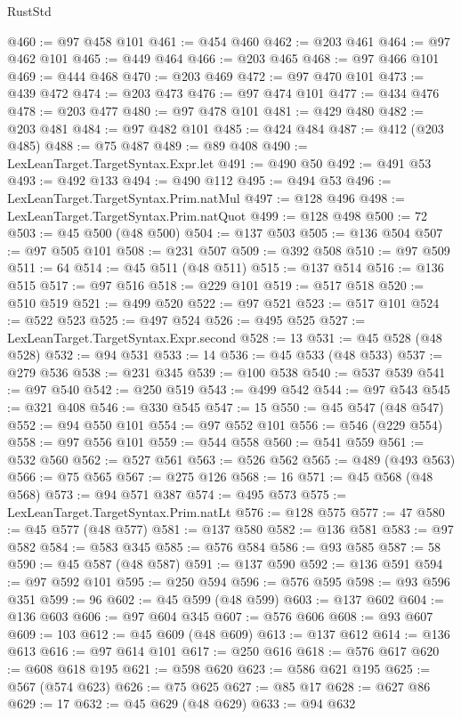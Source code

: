 \begin{lexlean}{RustStd}
\begin{coremodule}
@460 := @97 @458 @101
@461 := @454 @460
@462 := @203 @461
@464 := @97 @462 @101
@465 := @449 @464
@466 := @203 @465
@468 := @97 @466 @101
@469 := @444 @468
@470 := @203 @469
@472 := @97 @470 @101
@473 := @439 @472
@474 := @203 @473
@476 := @97 @474 @101
@477 := @434 @476
@478 := @203 @477
@480 := @97 @478 @101
@481 := @429 @480
@482 := @203 @481
@484 := @97 @482 @101
@485 := @424 @484
@487 := @412 (@203 @485)
@488 := @75 @487
@489 := @89 @408
@490 := LexLeanTarget.TargetSyntax.Expr.let
@491 := @490 @50
@492 := @491 @53
@493 := @492 @133
@494 := @490 @112
@495 := @494 @53
@496 := LexLeanTarget.TargetSyntax.Prim.natMul
@497 := @128 @496
@498 := LexLeanTarget.TargetSyntax.Prim.natQuot
@499 := @128 @498
@500 := 72
@503 := @45 @500 (@48 @500)
@504 := @137 @503
@505 := @136 @504
@507 := @97 @505 @101
@508 := @231 @507
@509 := @392 @508
@510 := @97 @509
@511 := 64
@514 := @45 @511 (@48 @511)
@515 := @137 @514
@516 := @136 @515
@517 := @97 @516
@518 := @229 @101
@519 := @517 @518
@520 := @510 @519
@521 := @499 @520
@522 := @97 @521
@523 := @517 @101
@524 := @522 @523
@525 := @497 @524
@526 := @495 @525
@527 := LexLeanTarget.TargetSyntax.Expr.second
@528 := 13
@531 := @45 @528 (@48 @528)
@532 := @94 @531
@533 := 14
@536 := @45 @533 (@48 @533)
@537 := @279 @536
@538 := @231 @345
@539 := @100 @538
@540 := @537 @539
@541 := @97 @540
@542 := @250 @519
@543 := @499 @542
@544 := @97 @543
@545 := @321 @408
@546 := @330 @545
@547 := 15
@550 := @45 @547 (@48 @547)
@552 := @94 @550 @101
@554 := @97 @552 @101
@556 := @546 (@229 @554)
@558 := @97 @556 @101
@559 := @544 @558
@560 := @541 @559
@561 := @532 @560
@562 := @527 @561
@563 := @526 @562
@565 := @489 (@493 @563)
@566 := @75 @565
@567 := @275 @126
@568 := 16
@571 := @45 @568 (@48 @568)
@573 := @94 @571 @387
@574 := @495 @573
@575 := LexLeanTarget.TargetSyntax.Prim.natLt
@576 := @128 @575
@577 := 47
@580 := @45 @577 (@48 @577)
@581 := @137 @580
@582 := @136 @581
@583 := @97 @582
@584 := @583 @345
@585 := @576 @584
@586 := @93 @585
@587 := 58
@590 := @45 @587 (@48 @587)
@591 := @137 @590
@592 := @136 @591
@594 := @97 @592 @101
@595 := @250 @594
@596 := @576 @595
@598 := @93 @596 @351
@599 := 96
@602 := @45 @599 (@48 @599)
@603 := @137 @602
@604 := @136 @603
@606 := @97 @604 @345
@607 := @576 @606
@608 := @93 @607
@609 := 103
@612 := @45 @609 (@48 @609)
@613 := @137 @612
@614 := @136 @613
@616 := @97 @614 @101
@617 := @250 @616
@618 := @576 @617
@620 := @608 @618 @195
@621 := @598 @620
@623 := @586 @621 @195
@625 := @567 (@574 @623)
@626 := @75 @625
@627 := @85 @17
@628 := @627 @86
@629 := 17
@632 := @45 @629 (@48 @629)
@633 := @94 @632

\end{coremodule}
\end{lexlean}
